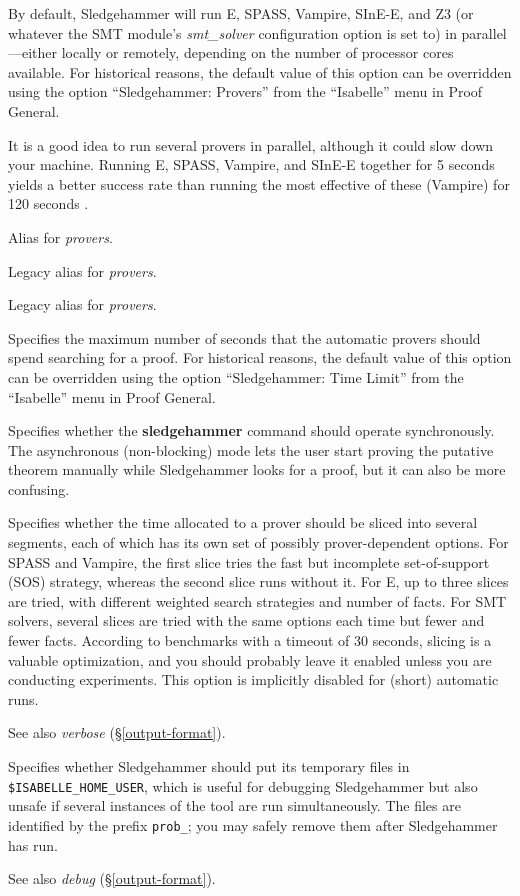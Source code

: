\documentclass[a4paper,12pt]{article}
\begin{document}
\begin{enum}
By default, Sledgehammer will run E, SPASS, Vampire, SInE-E, and Z3 (or whatever
the SMT module's \textit{smt\_solver} configuration option is set to) in
parallel---either locally or remotely, depending on the number of processor
cores available. For historical reasons, the default value of this option can be
overridden using the option ``Sledgehammer: Provers'' from the ``Isabelle'' menu
in Proof General.

It is a good idea to run several provers in parallel, although it could slow
down your machine. Running E, SPASS, Vampire, and SInE-E together for 5 seconds
yields a better success rate than running the most effective of these (Vampire)
for 120 seconds \cite{boehme-nipkow-2010}.

Alias for \textit{provers}.

Legacy alias for \textit{provers}.

Legacy alias for \textit{provers}.

Specifies the maximum number of seconds that the automatic provers should spend
searching for a proof. For historical reasons, the default value of this option
can be overridden using the option ``Sledgehammer: Time Limit'' from the
``Isabelle'' menu in Proof General.

Specifies whether the \textbf{sledgehammer} command should operate
synchronously. The asynchronous (non-blocking) mode lets the user start proving
the putative theorem manually while Sledgehammer looks for a proof, but it can
also be more confusing.

Specifies whether the time allocated to a prover should be sliced into several
segments, each of which has its own set of possibly prover-dependent options.
For SPASS and Vampire, the first slice tries the fast but incomplete
set-of-support (SOS) strategy, whereas the second slice runs without it. For E,
up to three slices are tried, with different weighted search strategies and
number of facts. For SMT solvers, several slices are tried with the same options
each time but fewer and fewer facts. According to benchmarks with a timeout of
30 seconds, slicing is a valuable optimization, and you should probably leave it
enabled unless you are conducting experiments. This option is implicitly
disabled for (short) automatic runs.

\nopagebreak
{\small See also \textit{verbose} (\S\ref{output-format}).}

Specifies whether Sledgehammer should put its temporary files in
\texttt{\$ISA\-BELLE\_\allowbreak HOME\_\allowbreak USER}, which is useful for
debugging Sledgehammer but also unsafe if several instances of the tool are run
simultaneously. The files are identified by the prefix \texttt{prob\_}; you may
safely remove them after Sledgehammer has run.

\nopagebreak
{\small See also \textit{debug} (\S\ref{output-format}).}
\end{enum}
\end{document}
